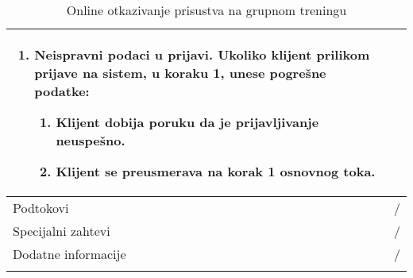 \documentclass[../grupniTreninzi.tex]{subfiles}
\begin{document}
\begin{longtable}{| p{} | p{} |}
\begin{enumerate}
        \item Neispravni podaci u prijavi. Ukoliko klijent prilikom prijave na sistem, u koraku 1, unese pogrešne podatke:
            \begin{enumerate}
                \item Klijent dobija poruku da je prijavljivanje neuspešno.
                \item Klijent se preusmerava na korak 1 osnovnog toka.
            \end{enumerate}    
    \end{enumerate}\\
\hline
    Podtokovi & /\\
\hline
    Specijalni zahtevi & /\\
\hline
    Dodatne informacije & /\\
\hline
\caption{Online otkazivanje prisustva na grupnom treningu} %
\end{longtable}
\end{document}
